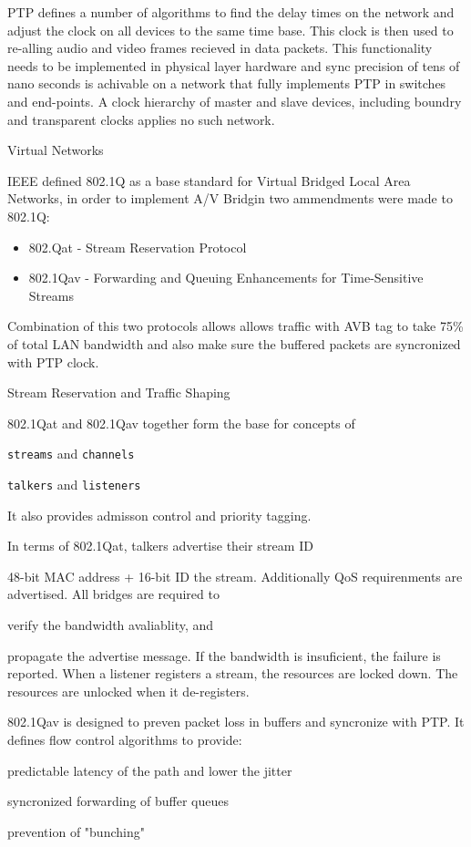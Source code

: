 { PTP defines a number of algorithms to find the delay times on the network
and adjust the clock on all devices to the same time base. This clock is then
used to re-alling audio and video frames recieved in data packets.
This functionality needs to be implemented in physical layer hardware and
sync precision of tens of nano seconds is achivable on a network that fully
implements PTP in switches and end-points. A clock hierarchy of master and
slave devices, including boundry and transparent clocks applies no such network. }

{ Virtual Networks }

IEEE defined 802.1Q as a base standard for Virtual Bridged Local Area Networks,
in order to implement A/V Bridgin two ammendments were made to 802.1Q:
\begin{itemize}
	\item 802.Qat - Stream Reservation Protocol
	\item 802.1Qav - Forwarding and Queuing Enhancements for Time-Sensitive Streams
\end{itemize}

Combination of this two protocols allows allows traffic with AVB tag to take 75\% of total
LAN bandwidth and also make sure the buffered packets are syncronized with PTP clock.

{ Stream Reservation and Traffic Shaping }

802.1Qat and 802.1Qav together form the base for concepts of
\item \texttt{streams} and \texttt{channels}
\item \texttt{talkers} and \texttt{listeners}

It also provides admisson control and priority tagging.

In terms of 802.1Qat, talkers advertise their stream ID
\item 48-bit MAC address + 16-bit ID the stream.
Additionally QoS requirenments are advertised.
All bridges are required to
\item verify the bandwidth avaliablity, and
\item propagate the advertise message.
If the bandwidth is insuficient, the failure is reported.
When a listener registers a stream, the resources are locked down.
The resources are unlocked when it de-registers.

802.1Qav is designed to preven packet loss in buffers and syncronize with PTP.
It defines flow control algorithms to provide:
\item predictable latency of the path and lower the jitter
\item syncronized forwarding of buffer queues
\item prevention of "bunching"

